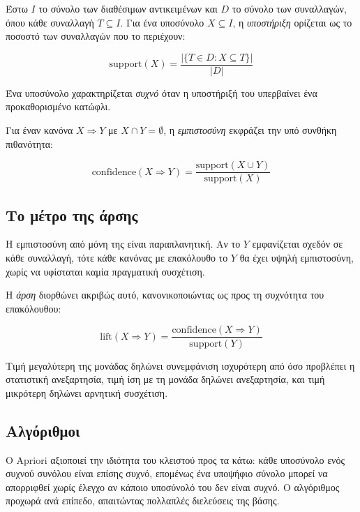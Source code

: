 Έστω $I$ το σύνολο των διαθέσιμων αντικειμένων και $D$ το σύνολο των
συναλλαγών, όπου κάθε συναλλαγή $T \subseteq I$. Για ένα υποσύνολο
$X \subseteq I$, η \emph{υποστήριξη} ορίζεται ως το ποσοστό των συναλλαγών που
το περιέχουν:

\begin{equation}
  \mathrm{support}(X) = \frac{|\{T \in D : X \subseteq T\}|}{|D|}
\end{equation}

Ένα υποσύνολο χαρακτηρίζεται \emph{συχνό} όταν η υποστήριξή του υπερβαίνει ένα
προκαθορισμένο κατώφλι.

Για έναν κανόνα $X \Rightarrow Y$ με $X \cap Y = \emptyset$, η
\emph{εμπιστοσύνη} εκφράζει την υπό συνθήκη πιθανότητα:

\begin{equation}
  \mathrm{confidence}(X \Rightarrow Y)
    = \frac{\mathrm{support}(X \cup Y)}{\mathrm{support}(X)}
\end{equation}

\subsection{Το μέτρο της άρσης}

Η εμπιστοσύνη από μόνη της είναι παραπλανητική. Αν το $Y$ εμφανίζεται σχεδόν σε
κάθε συναλλαγή, τότε κάθε κανόνας με επακόλουθο το $Y$ θα έχει υψηλή
εμπιστοσύνη, χωρίς να υφίσταται καμία πραγματική συσχέτιση.

Η \emph{άρση} διορθώνει ακριβώς αυτό, κανονικοποιώντας ως προς τη συχνότητα του
επακόλουθου:

\begin{equation}
  \mathrm{lift}(X \Rightarrow Y)
    = \frac{\mathrm{confidence}(X \Rightarrow Y)}{\mathrm{support}(Y)}
\end{equation}

Τιμή μεγαλύτερη της μονάδας δηλώνει συνεμφάνιση ισχυρότερη από όσο προβλέπει η
στατιστική ανεξαρτησία, τιμή ίση με τη μονάδα δηλώνει ανεξαρτησία, και τιμή
μικρότερη δηλώνει αρνητική συσχέτιση.

\subsection{Αλγόριθμοι}

Ο \textenglish{Apriori} \cite{agrawal1994fast} αξιοποιεί την ιδιότητα
του κλειστού προς τα κάτω: κάθε υποσύνολο ενός συχνού συνόλου είναι επίσης
συχνό, επομένως ένα υποψήφιο σύνολο μπορεί να απορριφθεί χωρίς έλεγχο αν
κάποιο υποσύνολό του δεν είναι συχνό. Ο αλγόριθμος προχωρά ανά επίπεδο,
απαιτώντας πολλαπλές διελεύσεις της βάσης.


